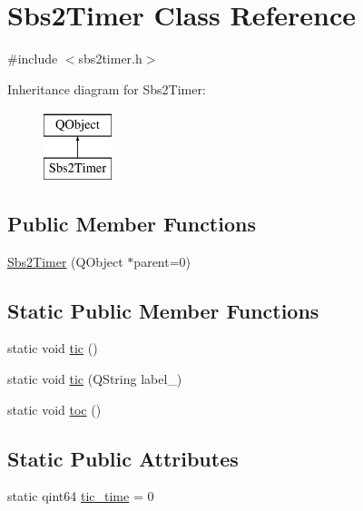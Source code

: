 \hypertarget{classSbs2Timer}{\section{Sbs2\-Timer Class Reference}
\label{classSbs2Timer}
}


{\ttfamily \#include $<$sbs2timer.\-h$>$}

Inheritance diagram for Sbs2\-Timer\-:\begin{figure}[H]
\begin{center}
\leavevmode
\includegraphics[height=2.000000cm]{classSbs2Timer}
\end{center}
\end{figure}
\subsection*{Public Member Functions}
\begin{DoxyCompactItemize}
\item 
\hyperlink{classSbs2Timer_ad7b35793f48ddcbd4a5fb14c5f277bd3}{Sbs2\-Timer} (Q\-Object $\ast$parent=0)
\end{DoxyCompactItemize}
\subsection*{Static Public Member Functions}
\begin{DoxyCompactItemize}
\item 
static void \hyperlink{classSbs2Timer_a496729d5514d8dd99b2d20f584c743e9}{tic} ()
\item 
static void \hyperlink{classSbs2Timer_a0316896c140e62155e45a0a5c3382432}{tic} (Q\-String label\-\_\-)
\item 
static void \hyperlink{classSbs2Timer_ac4a8bdc4eceb47ac9971425332eb7aee}{toc} ()
\end{DoxyCompactItemize}
\subsection*{Static Public Attributes}
\begin{DoxyCompactItemize}
\item 
static qint64 \hyperlink{classSbs2Timer_acd1e0853bb3a6e0477f86d5f00546c9a}{tic\-\_\-time} = 0
\end{DoxyCompactItemize}



